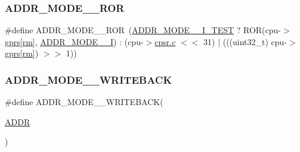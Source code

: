 \mbox{\label{isa-arm_8c_aaca37bb8bd19deeb47a5427bef082525}} 
\subsubsection{\texorpdfstring{A\+D\+D\+R\+\_\+\+M\+O\+D\+E\+\_\+\_\+\+R\+OR}{ADDR\_MODE\_2\_ROR}}
{\footnotesize\ttfamily \#define A\+D\+D\+R\+\_\+\+M\+O\+D\+E\+\_\+\_\+\+R\+OR~(\mbox{\hyperlink{isa-arm_8c_aaeae2827f85b4a89e95d7136db35a6f1}{A\+D\+D\+R\+\_\+\+M\+O\+D\+E\+\_\+\_\+\+I\+\_\+\+T\+E\+ST}} ? R\+OR(cpu-\/$>$\mbox{\hyperlink{isa-thumb_8c_a6b4b7e13a9a144391615b217c5917bc7}{gprs}}\mbox{[}\mbox{\hyperlink{isa-thumb_8c_a20e40d2fb8c51fa4dd2b4449ad32e111}{rm}}\mbox{]}, \mbox{\hyperlink{isa-arm_8c_aab74ad6dee8d6e1d4037dad7928b3514}{A\+D\+D\+R\+\_\+\+M\+O\+D\+E\+\_\+\_\+I}}) \+: (cpu-\/$>$\mbox{\hyperlink{isa-lr35902_8c_ab27f9f98dd173bfc694f5d161e839d6e}{cpsr.\+c}} $<$$<$ 31) $\vert$ (((uint32\+\_\+t) cpu-\/$>$\mbox{\hyperlink{isa-thumb_8c_a6b4b7e13a9a144391615b217c5917bc7}{gprs}}\mbox{[}\mbox{\hyperlink{isa-thumb_8c_a20e40d2fb8c51fa4dd2b4449ad32e111}{rm}}\mbox{]}) $>$$>$ 1))}

\mbox{\label{isa-arm_8c_a6cbeb951edc491533b2b648bb318961b}} 
\subsubsection{\texorpdfstring{A\+D\+D\+R\+\_\+\+M\+O\+D\+E\+\_\+\_\+\+W\+R\+I\+T\+E\+B\+A\+CK}{ADDR\_MODE\_2\_WRITEBACK}}
{\footnotesize\ttfamily \#define A\+D\+D\+R\+\_\+\+M\+O\+D\+E\+\_\+\_\+\+W\+R\+I\+T\+E\+B\+A\+CK(\begin{DoxyParamCaption}\item[{}]{\mbox{\hyperlink{sqlite3_8c_a5ce4347ce4f7fb635d839077f4633194}{A\+D\+DR}} }\end{DoxyParamCaption})}

